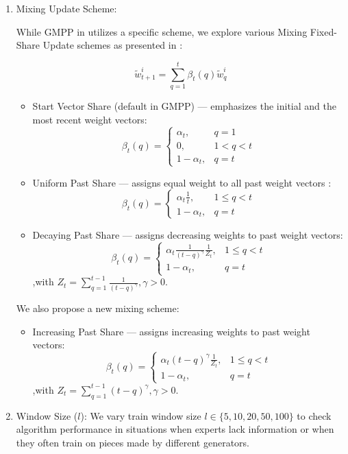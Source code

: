 \documentclass[12pt, twoside]{article}
\begin{document}
\begin{enumerate}
\item Mixing Update Scheme:

While GMPP in \cite{vvbook} utilizes a specific scheme, we explore various Mixing Fixed-Share Update schemes as presented in \cite{article02}:

\[ \widetilde{w}_{t+1}^i = \sum_{q=1}^t\beta_t(q)\widetilde{w}_q^i  \]

\begin{itemize}
\item Start Vector Share (default in GMPP) --- emphasizes the initial and the most recent  weight  vectors:
    \[\beta_t(q) =
    \begin{cases}
    \alpha_t, & q = 1 \\
    0, & 1 < q < t \\
    1 - \alpha_t, & q = t 
    \end{cases}\]
    
\item Uniform Past Share ---  assigns equal weight to all past weight vectors : 
    \[\beta_t(q) =
    \begin{cases}
    \alpha_t\frac{1}{t}, & 1 \le q < t \\
    1 - \alpha_t, & q = t 
    \end{cases}\]
    
\item Decaying Past Share ---  assigns decreasing weights to past weight vectors:
    \[\beta_t(q) =
    \begin{cases}
    \alpha_t\frac{1}{(t-q)^\gamma}\frac{1}{Z_t}, & 1 \le q < t \\
    1 - \alpha_t, & q = t
    \end{cases}\]
    \hfill ,with $Z_t = \sum_{q=1}^{t-1} \frac{1}{(t-q)^\gamma}, \gamma > 0$. 
        
\end{itemize}

We also propose a new mixing scheme:
\begin{itemize}

\item Increasing Past Share --- assigns increasing weights to past weight vectors:
    \[\beta_t(q) =
    \begin{cases}
    \alpha_t(t-q)^\gamma\frac{1}{Z_t}, & 1 \le q < t \\
    1 - \alpha_t, & q = t
    \end{cases}\]
    \hfill ,with $Z_t = \sum_{q=1}^{t-1}(t-q)^\gamma, \gamma > 0$. 
        
\end{itemize}


\item Window Size ($l$): We vary train window size $l \in \{5, 10, 20, 50, 100\}$ to check algorithm performance in situations when experts lack information or when they often train on pieces made by different generators.

\end{enumerate}
\end{document}
